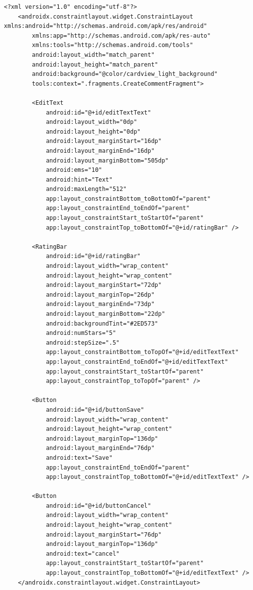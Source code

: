 \begin{lstlisting}[label=list:android_xml_create_comment,caption=Opis fragmentu tworzenia komentarza,basicstyle=\tiny\ttfamily]
    <?xml version="1.0" encoding="utf-8"?>
    <androidx.constraintlayout.widget.ConstraintLayout xmlns:android="http://schemas.android.com/apk/res/android"
        xmlns:app="http://schemas.android.com/apk/res-auto"
        xmlns:tools="http://schemas.android.com/tools"
        android:layout_width="match_parent"
        android:layout_height="match_parent"
        android:background="@color/cardview_light_background"
        tools:context=".fragments.CreateCommentFragment">
    
        <EditText
            android:id="@+id/editTextText"
            android:layout_width="0dp"
            android:layout_height="0dp"
            android:layout_marginStart="16dp"
            android:layout_marginEnd="16dp"
            android:layout_marginBottom="505dp"
            android:ems="10"
            android:hint="Text"
            android:maxLength="512"
            app:layout_constraintBottom_toBottomOf="parent"
            app:layout_constraintEnd_toEndOf="parent"
            app:layout_constraintStart_toStartOf="parent"
            app:layout_constraintTop_toBottomOf="@+id/ratingBar" />
    
        <RatingBar
            android:id="@+id/ratingBar"
            android:layout_width="wrap_content"
            android:layout_height="wrap_content"
            android:layout_marginStart="72dp"
            android:layout_marginTop="26dp"
            android:layout_marginEnd="73dp"
            android:layout_marginBottom="22dp"
            android:backgroundTint="#2ED573"
            android:numStars="5"
            android:stepSize=".5"
            app:layout_constraintBottom_toTopOf="@+id/editTextText"
            app:layout_constraintEnd_toEndOf="@+id/editTextText"
            app:layout_constraintStart_toStartOf="parent"
            app:layout_constraintTop_toTopOf="parent" />
    
        <Button
            android:id="@+id/buttonSave"
            android:layout_width="wrap_content"
            android:layout_height="wrap_content"
            android:layout_marginTop="136dp"
            android:layout_marginEnd="76dp"
            android:text="Save"
            app:layout_constraintEnd_toEndOf="parent"
            app:layout_constraintTop_toBottomOf="@+id/editTextText" />
    
        <Button
            android:id="@+id/buttonCancel"
            android:layout_width="wrap_content"
            android:layout_height="wrap_content"
            android:layout_marginStart="76dp"
            android:layout_marginTop="136dp"
            android:text="cancel"
            app:layout_constraintStart_toStartOf="parent"
            app:layout_constraintTop_toBottomOf="@+id/editTextText" />
    </androidx.constraintlayout.widget.ConstraintLayout>
\end{lstlisting}
